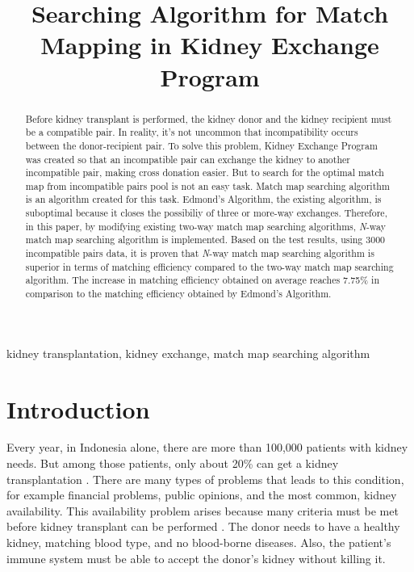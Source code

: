 \documentclass[conference]{IEEEtran}
\begin{document}
\title{Searching Algorithm for Match Mapping in Kidney Exchange Program}

\author{
\and
{}
\and
{}
}

\maketitle

\begin{abstract}
Before kidney transplant is performed, the kidney donor and the kidney recipient must
be a compatible pair. In reality, it's not uncommon that incompatibility occurs between the donor-recipient pair.
To solve this problem, Kidney Exchange Program was created so that an incompatible pair can exchange the kidney
to another incompatible pair, making cross donation easier. But to search for the optimal match map from incompatible
pairs pool is not an easy task. Match map searching algorithm is an algorithm created for this task. Edmond's
Algorithm, the existing algorithm, is suboptimal because it closes the possibiliy of three or more-way exchanges.
Therefore, in this paper, by modifying existing two-way match map searching algorithms, \textit{N}-way match
map searching algorithm is implemented. Based on the test results, using 3000 incompatible pairs data, it is
proven that \textit{N}-way match map searching algorithm is superior in terms of matching efficiency compared to
the two-way match map searching algorithm. The increase in matching efficiency obtained on average reaches 7.75\%
in comparison to the matching efficiency obtained by Edmond's Algorithm. 
\end{abstract}

\begin{IEEEkeywords}
kidney transplantation, kidney exchange, match map searching algorithm
\end{IEEEkeywords}

\section{Introduction}
Every year, in Indonesia alone, there are more than 100,000 patients with kidney needs. But among
those patients, only about 20\% can get a kidney transplantation \cite{wiradarma}. There are many types
of problems that leads to this condition, for example financial problems, public opinions, and the most
common, kidney availability.
This availability problem arises because many criteria must be met before kidney transplant can be
performed \cite{wiradarma}. The donor needs to have a healthy kidney, matching blood type, and no blood-borne
diseases. Also, the patient's immune system must be able to accept the donor's kidney without killing it.
\end{document}
